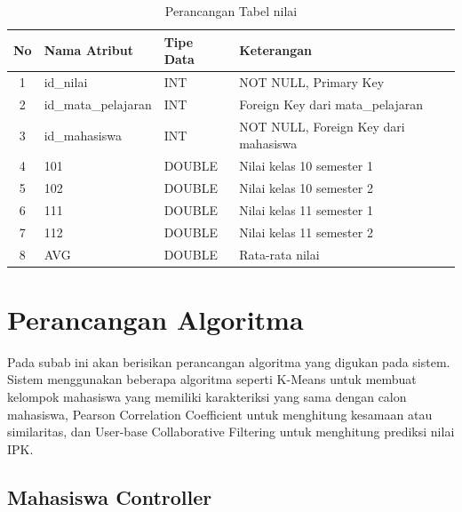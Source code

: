 \begin{enumerate}
        \begin{table}[H]
            \centering
            \begin{tabular}{|c|p{4cm}|p{4cm}|p{4cm}|}
                \hline
                No & Nama Atribut & Tipe Data & Keterangan \\
                \hline
                1 & id\_nilai & INT & NOT NULL, Primary Key \\
                \hline
                2 & id\_mata\_pelajaran & INT & Foreign Key dari mata\_pelajaran \\
                \hline
                3 & id\_mahasiswa & INT & NOT NULL, Foreign Key dari mahasiswa \\
                \hline
                4 & 101 & DOUBLE & Nilai kelas 10 semester 1 \\
                \hline
                5 & 102 & DOUBLE & Nilai kelas 10 semester 2 \\
                \hline
                6 & 111 & DOUBLE & Nilai kelas 11 semester 1 \\
                \hline
                7 & 112 & DOUBLE & Nilai kelas 11 semester 2 \\
                \hline
                8 & AVG & DOUBLE & Rata-rata nilai \\
                \hline
            \end{tabular}
            \caption{Perancangan Tabel nilai}
            \label{tab:perancangan tabel nilai}
        \end{table}
\end{enumerate}

\section{Perancangan Algoritma}
\label{sec:perancangan algoritma}

Pada subab ini akan berisikan perancangan algoritma yang digukan pada sistem. Sistem menggunakan beberapa algoritma seperti K-Means untuk membuat kelompok mahasiswa yang memiliki karakteriksi yang sama dengan calon mahasiswa, Pearson Correlation Coefficient untuk menghitung kesamaan atau similaritas, dan User-base Collaborative Filtering untuk menghitung prediksi nilai IPK.

\subsection{Mahasiswa Controller}
\label{subsec:mahasiswa controller}

